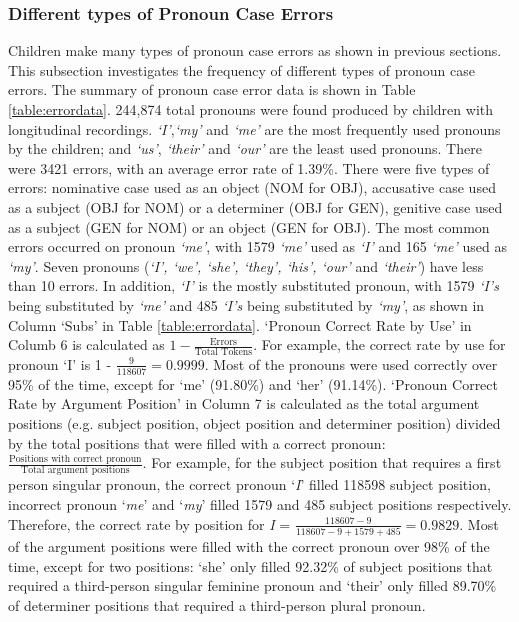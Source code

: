 \subsubsection{Different types of Pronoun Case Errors}
Children make many types of pronoun case errors as shown in previous sections. This subsection investigates the frequency of different types of pronoun case errors. The summary of pronoun case error data is shown in Table \ref{table:errordata}. 244,874 total pronouns were found produced by children with longitudinal recordings. \textit{`I'},\textit{`my'} and \textit{`me'} are the most frequently used pronouns by the children; and \textit{`us'}, \textit{`their'} and \textit{`our'} are the least used pronouns. There were 3421 errors, with an average error rate of 1.39\%. There were five types of errors: nominative case used as an object (NOM for OBJ), accusative case used as a subject (OBJ for NOM) or a determiner (OBJ for GEN), genitive case used as a subject (GEN for NOM) or an object (GEN for OBJ). The most common errors occurred on pronoun \textit{`me'}, with 1579 \textit{`me'} used as \textit{`I'} and 165 \textit{`me'} used as \textit{`my'}. Seven pronouns (\textit{`I', `we', `she', `they', `his', `our'} and \textit{`their'}) have less than 10 errors. In addition, \textit{`I'} is the mostly substituted pronoun, with 1579 \textit{`I's} being substituted by \textit{`me'} and 485 \textit{`I's} being substituted by \textit{`my'}, as shown in Column `Subs' in Table \ref{table:errordata}. `Pronoun Correct Rate by Use' in Columb 6 is calculated as $1 - \displaystyle\frac{\text{Errors}}{\text{Total Tokens}}$.  For example, the correct rate by use for pronoun `I' is 1 -  $\displaystyle\frac{9}{118607} = 0.9999$. Most of the pronouns were used correctly over 95\% of the time, except for ‘me’ (91.80\%) and ‘her’ (91.14\%). `Pronoun Correct Rate by Argument Position' in Column 7 is calculated as the total argument positions (e.g. subject position, object position and determiner position) divided by the total positions that were  filled with a correct pronoun: $\displaystyle\frac{\text{Positions with correct pronoun}}{\text{Total argument positions}}$.  For example, for the subject position that requires a first person singular pronoun, the correct pronoun `\textit{I}' filled 118598 subject position, incorrect pronoun `\textit{me}' and `\textit{my}' filled 1579 and 485 subject positions respectively. Therefore, the correct rate by position for \textit{I} = $\displaystyle\frac{118607 - 9}{118607 - 9 + 1579 + 485} = 0.9829$. Most of the argument positions were filled with the correct pronoun over 98\% of the time, except for two positions: ‘she’ only filled 92.32\% of subject positions that required a third-person singular feminine pronoun and ‘their’ only filled 89.70\% of determiner positions that required a third-person plural pronoun. 

